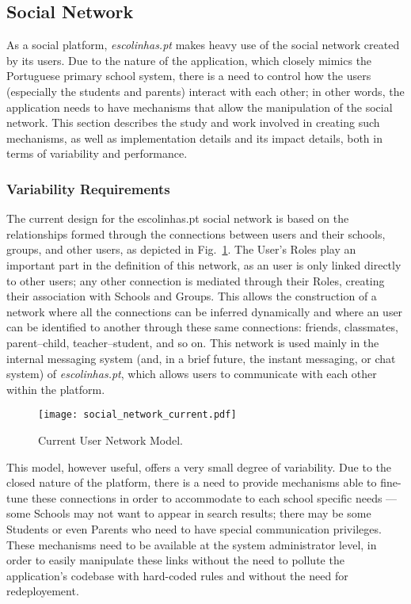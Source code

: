 \subsection{Social Network}\label{sec:fa_social_network}

As a social platform, \emph{escolinhas.pt} makes heavy use of the social network created by its users. Due to the nature of the application, which closely mimics the Portuguese primary school system, there is a need to control how the users (especially the students and parents) interact with each other; in other words, the application needs to have mechanisms that allow the manipulation of the social network. This section describes the study and work involved in creating such mechanisms, as well as implementation details and its impact details, both in terms of variability and performance.

\subsubsection{Variability Requirements}\label{sec:fa_social_network_variability_requirements}

The current design for the escolinhas.pt social network is based on the relationships formed through the connections between users and their schools, groups, and other users, as depicted in Fig.~\ref{fig:social_network_current}. The User's Roles play an important part in the definition of this network, as an user is only linked directly to other users; any other connection is mediated through their Roles, creating their association with Schools and Groups. This allows the construction of a network where all the connections can be inferred dynamically and where an user can be identified to another through these same connections: friends, classmates, parent--child, teacher--student, and so on. This network is used mainly in the internal messaging system (and, in a brief future, the instant messaging, or chat system) of \emph{escolinhas.pt}, which allows users to communicate with each other within the platform.

\begin{figure}[H]
  \centering
  \texttt{[image: social\_network\_current.pdf]}
  \caption{Current User Network Model.}
  \label{fig:social_network_current}
\end{figure}

This model, however useful, offers a very small degree of variability. Due to the closed nature of the platform, there is a need to provide mechanisms able to fine-tune these connections in order to accommodate to each school specific needs --- some Schools may not want to appear in search results; there may be some Students or even Parents who need to have special communication privileges. These mechanisms need to be available at the system administrator level, in order to easily manipulate these links without the need to pollute the application's codebase with hard-coded rules and without the need for redeployement.


